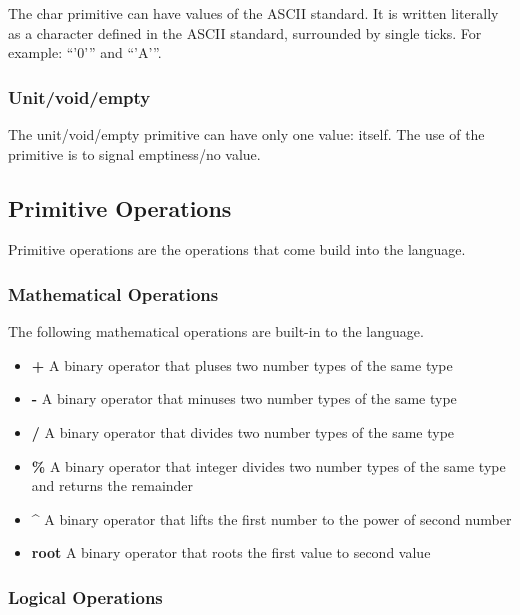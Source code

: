 The char primitive can have values of the ASCII standard. It is written literally as a character defined in the ASCII standard, surrounded by single ticks. For example: \enquote{'0'} and \enquote{'A'}.

\subsubsection{Unit/void/empty}
\label{sec:unit/empty/void}

The unit/void/empty primitive can have only one value: itself. The use of the primitive is to signal emptiness/no value.

\subsection{Primitive Operations}
\label{sec:primitiveOps}

Primitive operations are the operations that come build into the language.

\subsubsection{Mathematical Operations}
\label{sec:mathOps}

The following mathematical operations are built-in to the language.

\begin{itemize}
  \item \textbf{+} A binary operator that pluses two number types of the same type
  \item \textbf{-} A binary operator that minuses two number types of the same type
  \item \textbf{/} A binary operator that divides two number types of the same type
  \item \textbf{\%} A binary operator that integer divides two number types of the same type and returns the remainder
  \item \textbf{\^}  A binary operator that lifts the first number to the power of second number
  \item \textbf{root} A binary operator that roots the first value to second value
\end{itemize}


\subsubsection{Logical Operations}
\label{sec:logicOps}

